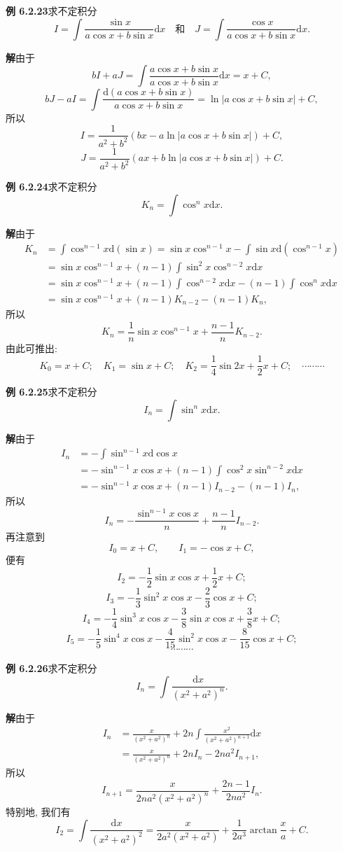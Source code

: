 \documentclass[UTF8,12pt,a4paper,fontset=fandol]{ctexart}
\begin{document}
\noindent\textbf{例 6.2.23}\quad 求不定积分
\[
  I=\int\frac{\sin x}{a\cos x+b\sin x}\mathrm dx
  \quad\text{和}\quad
  J=\int\frac{\cos x}{a\cos x+b\sin x}\mathrm dx.
\]

\noindent\textbf{解}\quad 由于
\[
  bI+aJ=
  \int\frac{a\cos x+b\sin x}{a\cos x+b\sin x}\mathrm dx
  =
  x+C,
\]
\[
  bJ-aI=
  \int\frac{\mathrm d(a\cos x+b\sin x)}{a\cos x+b\sin x}
  =
  \ln|a\cos x+b\sin x|+C,
\]
所以
\[
  I=\frac1{a^2+b^2}(bx-a\ln|a\cos x+b\sin x|)+C,
\]
\[
  J=\frac1{a^2+b^2}(ax+b\ln|a\cos x+b\sin x|)+C.
\]

\noindent\textbf{例 6.2.24}\quad 求不定积分
\[
  K_n=\int\cos^nx\mathrm dx.
\]

\noindent\textbf{解}\quad 由于
\[
\begin{aligned}
  K_n
  &=
  \int\cos^{n-1}x\mathrm d(\sin x)
  =
  \sin x\cos^{n-1}x-\int\sin x\mathrm d(\cos^{n-1}x)\\
  &=
  \sin x\cos^{n-1}x+(n-1)\int\sin^2x\cos^{n-2}x\mathrm dx\\
  &=
  \sin x\cos^{n-1}x+(n-1)\int\cos^{n-2}x\mathrm dx
  -(n-1)\int\cos^nx\mathrm dx\\
  &=
  \sin x\cos^{n-1}x+(n-1)K_{n-2}-(n-1)K_n,
\end{aligned}
\]
所以
\[
  K_n=\frac1n\sin x\cos^{n-1}x+\frac{n-1}nK_{n-2}.
\]
由此可推出:
\[
  K_0=x+C;\quad
  K_1=\sin x+C;\quad
  K_2=\frac14\sin2x+\frac12x+C;\quad
  \cdots\cdots\cdots
\]

\noindent\textbf{例 6.2.25}\quad 求不定积分
\[
  I_n=\int\sin^nx\mathrm dx.
\]

\noindent\textbf{解}\quad 由于
\[
\begin{aligned}
  I_n
  &=
  -\int\sin^{n-1}x\mathrm d\cos x\\
  &=
  -\sin^{n-1}x\cos x+(n-1)\int\cos^2x\sin^{n-2}x\mathrm dx\\
  &=
  -\sin^{n-1}x\cos x+(n-1)I_{n-2}-(n-1)I_n,
\end{aligned}
\]
所以
\[
  I_n=-\frac{\sin^{n-1}x\cos x}{n}+\frac{n-1}{n}I_{n-2}.
\]
再注意到
\[
  I_0=x+C,\qquad I_1=-\cos x+C,
\]
便有
\[
  I_2=-\frac12\sin x\cos x+\frac12x+C;
\]
\[
  I_3=-\frac13\sin^2x\cos x-\frac23\cos x+C;
\]
\[
  I_4=-\frac14\sin^3x\cos x-\frac38\sin x\cos x+\frac38x+C;
\]
\[
  I_5=-\frac15\sin^4x\cos x-\frac4{15}\sin^2x\cos x-\frac8{15}\cos x+C;
\]
\[
  \cdots\cdots\cdots
\]

\noindent\textbf{例 6.2.26}\quad 求不定积分
\[
  I_n=\int\frac{\mathrm dx}{(x^2+a^2)^n}.
\]

\noindent\textbf{解}\quad 由于
\[
\begin{aligned}
  I_n
  &=
  \frac{x}{(x^2+a^2)^n}
  +
  2n\int\frac{x^2}{(x^2+a^2)^{n+1}}\mathrm dx\\
  &=
  \frac{x}{(x^2+a^2)^n}
  +
  2nI_n-2na^2I_{n+1},
\end{aligned}
\]
所以
\[
  I_{n+1}=
  \frac{x}{2na^2(x^2+a^2)^n}+\frac{2n-1}{2na^2}I_n.
\]
特别地, 我们有
\[
  I_2=
  \int\frac{\mathrm dx}{(x^2+a^2)^2}
  =
  \frac{x}{2a^2(x^2+a^2)}+\frac1{2a^3}\arctan\frac xa+C.
\]
\end{document}
